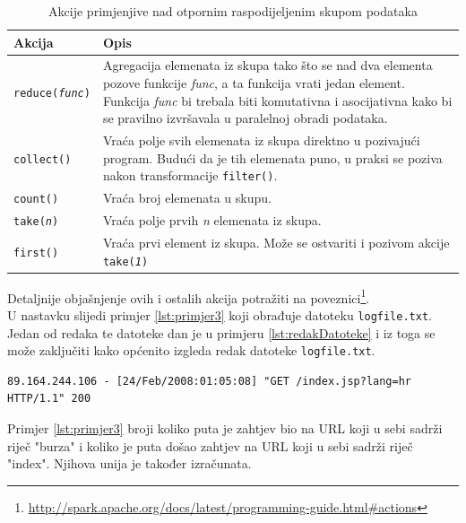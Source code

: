 \documentclass[times, utf8, zavrsni, numeric]{fer}
\begin{document}
\begin{table}[htb]
\caption{Akcije primjenjive nad otpornim raspodijeljenim skupom podataka}
\label{tbl:akcije}
\centering
\begin{tabular}{lp{8cm}} 
\hline
Akcija & Opis \\
\hline
\texttt{reduce(\emph{func})} & Agregacija elemenata iz skupa tako što se nad dva elementa pozove funkcije \emph{func}, a ta funkcija vrati jedan element. Funkcija \emph{func} bi trebala biti komutativna i asocijativna kako bi se pravilno izvršavala u paralelnoj obradi podataka.\\
\texttt{collect()} & Vraća polje svih elemenata iz skupa direktno u pozivajući program. Budući da je tih elemenata puno, u praksi se poziva nakon transformacije \texttt{filter()}. \\
\texttt{count()} & Vraća broj elemenata u skupu. \\
\texttt{take(\emph{n})} & Vraća polje prvih \emph{n} elemenata iz skupa. \\
\texttt{first()} & Vraća prvi element iz skupa. Može se ostvariti i pozivom akcije \texttt{take(\emph{1})}\\
\hline
\end{tabular}
\end{table}
Detaljnije objašnjenje ovih i ostalih akcija potražiti na poveznici\footnote{\url{http://spark.apache.org/docs/latest/programming-guide.html#actions}}.
\\

U nastavku slijedi primjer \ref{lst:primjer3} koji obrađuje datoteku \texttt{logfile.txt}.
Jedan od redaka te datoteke dan je u primjeru \ref{lst:redakDatoteke} i iz toga se može zaključiti kako općenito izgleda redak datoteke \texttt{logfile.txt}.
\begin{lstlisting}[label={lst:redakDatoteke}, basicstyle=\small, caption={Korištenje transformacija i akcija.}]
89.164.244.106 - [24/Feb/2008:01:05:08] "GET /index.jsp?lang=hr HTTP/1.1" 200
\end{lstlisting}

Primjer \ref{lst:primjer3} broji koliko puta je zahtjev bio na URL koji u sebi sadrži riječ "burza" i koliko je puta došao zahtjev na URL koji u sebi sadrži riječ "index". Njihova unija je također izračunata.
 
\end{document}
